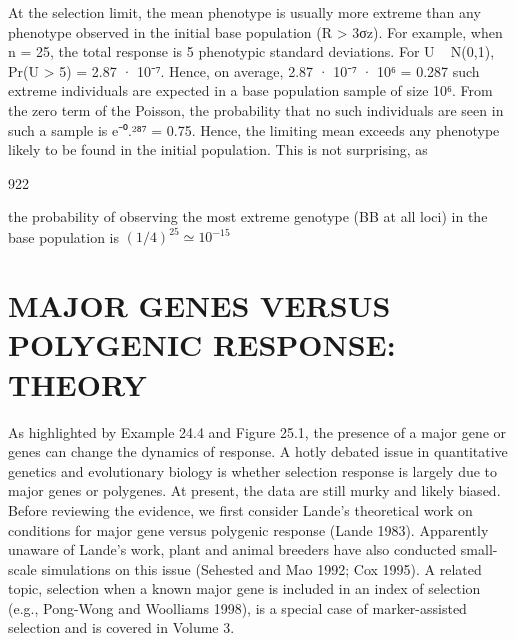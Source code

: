 \documentclass{article}
\begin{document}
At the selection limit, the mean phenotype is usually more extreme than any phenotype observed in the initial base population (R > 3σz). For example, when n = 25, the total response is 5 phenotypic standard deviations. For U ~ N(0,1), Pr(U > 5) = 2.87 · 10⁻⁷. Hence, on average, 2.87 · 10⁻⁷ · 10⁶ = 0.287 such extreme individuals are expected in a base population sample of size 10⁶. From the zero term of the Poisson, the probability that no such individuals are seen in such a sample is e⁻⁰.²⁸⁷ = 0.75. Hence, the limiting mean exceeds any phenotype likely to be found in the initial population. This is not surprising, as

922

the probability of observing the most extreme genotype (BB at all loci) in the base population is  $ (1/4)^{25} \simeq 10^{-15} $

\section{MAJOR GENES VERSUS POLYGENIC RESPONSE: THEORY}
As highlighted by Example 24.4 and Figure 25.1, the presence of a major gene or genes can change the dynamics of response. A hotly debated issue in quantitative genetics and evolutionary biology is whether selection response is largely due to major genes or polygenes. At present, the data are still murky and likely biased. Before reviewing the evidence, we first consider Lande's theoretical work on conditions for major gene versus polygenic response (Lande 1983). Apparently unaware of Lande's work, plant and animal breeders have also conducted small-scale simulations on this issue (Sehested and Mao 1992; Cox 1995). A related topic, selection when a known major gene is included in an index of selection (e.g., Pong-Wong and Woolliams 1998), is a special case of marker-assisted selection and is covered in Volume 3.
\end{document}
